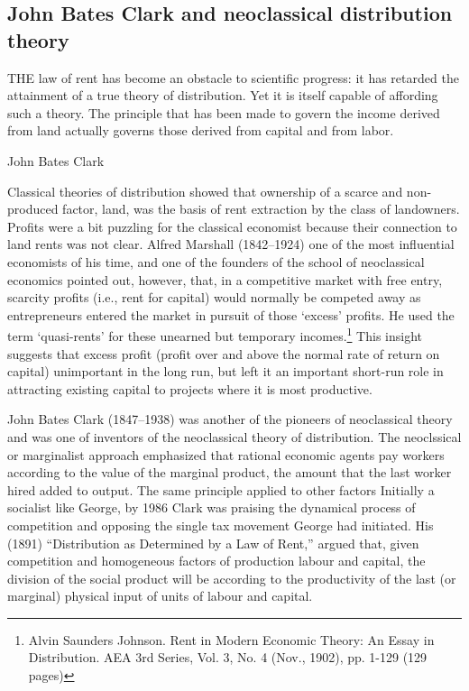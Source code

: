   \subsection{John Bates Clark and neoclassical distribution theory}
  \epigraph{THE law of rent has become an obstacle to scientific progress: it has retarded the attainment of a true theory of distribution. Yet it is itself capable of affording such a theory. The principle that has been made to govern the income derived from land actually governs those derived from capital and from labor. }{John Bates Clark \cite{clarkDistributionDeterminedLaw1891}}

  
  Classical theories of distribution showed that ownership of a scarce and non-produced factor, land, was the  basis of rent extraction by the class of landowners. Profits were a bit puzzling for the classical economist because their connection to land rents was not clear. %
  Alfred Marshall (1842--1924)  one of the most influential economists of his time, and one of the founders of the school of neoclassical economics   %
   pointed out, however, that, in a competitive market with free entry, scarcity profits (i.e., rent for capital) would normally be competed away  as entrepreneurs entered the market in pursuit of those `excess' profits. He used the term `quasi-rents' for these unearned but temporary incomes.\footnote{Alvin Saunders Johnson. Rent in Modern Economic Theory: An Essay in Distribution. AEA 3rd Series, Vol. 3, No. 4 (Nov., 1902), pp. 1-129 (129 pages)} This insight suggests that excess profit (profit over and above the normal rate of return on capital) unimportant in the long run, but left it an important short-run role in attracting existing capital to projects where it is most productive. 

 John Bates Clark (1847--1938) was another of the pioneers of neoclassical theory and was one of inventors of the neoclassical theory of  distribution.  The neoclssical or marginalist approach emphasized that rational economic agents  pay workers according to the value of the marginal product, the amount that the last worker hired added to output. %
 The same principle applied to other factors  
 Initially a socialist like George,   %
 by 1986 Clark was praising the dynamical process of competition and opposing the single tax movement George had initiated.  His (1891) ``Distribution as Determined by a Law of Rent,''\cite{clarkDistributionDeterminedLaw1891} argued that, given  competition and homogeneous factors of production labour and capital, the division of the social product will be according to the productivity of the last (or marginal) physical input of units of labour and capital.

